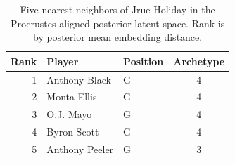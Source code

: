 \begin{table}[htbp]
  \centering\small
  \begin{tabular}{rllc}
    \toprule
    Rank & Player & Position & Archetype \\
    \midrule
    1 & Anthony Black & G & 4 \\
    2 & Monta Ellis & G & 4 \\
    3 & O.J. Mayo & G & 4 \\
    4 & Byron Scott & G & 4 \\
    5 & Anthony Peeler & G & 3 \\
    \bottomrule
  \end{tabular}
  \caption{Five nearest neighbors of Jrue Holiday in the Procrustes-aligned posterior latent space. Rank is by posterior mean embedding distance.}
  \label{tab:Jrue_Holiday_neighbors}
\end{table}

